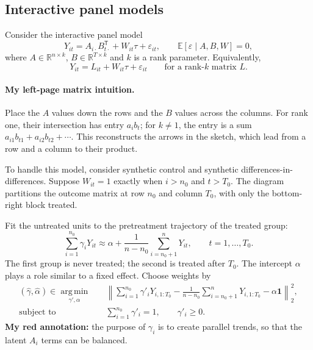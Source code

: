\subsection{Interactive panel models}
Consider the interactive panel model
\[
 Y_{it}=A_{i\cdot}B_{t\cdot}^{\mathsf T}+W_{it}\tau+\varepsilon_{it},
 \qquad\mathbb E[\varepsilon\mid A,B,W]=0,\tag{8.5}
\]
where $A\in\mathbb R^{n\times k}$, $B\in\mathbb R^{T\times k}$ and $k$ is a rank parameter. Equivalently,
\[
 Y_{it}=L_{it}+W_{it}\tau+\varepsilon_{it}
 \qquad\text{for a rank-$k$ matrix }L.
\]
\paragraph{My left-page matrix intuition.}
Place the $A$ values down the rows and the $B$ values across the columns. For rank one, their intersection has entry $a_i b_t$; for $k\ne1$, the entry is a sum $a_{i1}b_{t1}+a_{i2}b_{t2}+\cdots$. This reconstructs the arrows in the sketch, which lead from a row and a column to their product.

To handle this model, consider synthetic control and synthetic differences-in-differences. Suppose $W_{it}=1$ exactly when $i>n_0$ and $t>T_0$. The diagram partitions the outcome matrix at row $n_0$ and column $T_0$, with only the bottom-right block treated.

Fit the untreated units to the pretreatment trajectory of the treated group:
\[
 \sum_{i=1}^{n_0}\gamma_iY_{it}
 \approx\alpha+\frac1{n-n_0}\sum_{i=n_0+1}^nY_{it},
 \qquad t=1,\ldots,T_0.
\]
The first group is never treated; the second is treated after $T_0$. The intercept $\alpha$ plays a role similar to a fixed effect. Choose weights by
\begin{align*}
 (\widehat\gamma,\widehat\alpha)\in
 \operatorname*{arg\,min}_{\gamma',\alpha}\quad&
 \left\|\sum_{i=1}^{n_0}\gamma'_iY_{i,1:T_0}
 -\frac1{n-n_0}\sum_{i=n_0+1}^nY_{i,1:T_0}
 -\alpha\mathbf1\right\|_2^2,\\
 \text{subject to}\quad&\sum_{i=1}^{n_0}\gamma'_i=1,
 \qquad\gamma'_i\ge0.\tag{8.7}
\end{align*}
\textbf{My red annotation:} the purpose of $\gamma_i$ is to create parallel trends, so that the latent $A_i$ terms can be balanced.

